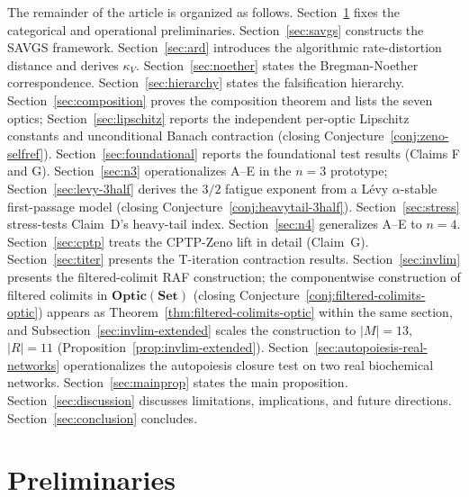 \documentclass[11pt,a4paper]{article}
\theoremstyle{plain}
\theoremstyle{definition}
\theoremstyle{remark}
\newcommand{\kk}{\kappa_{\!V}}
\newcommand{\Optic}{\mathbf{Optic}}
\begin{document}
The remainder of the article is organized as follows.
Section~\ref{sec:prelim} fixes the categorical and operational
preliminaries. Section~\ref{sec:savgs} constructs the SAVGS framework.
Section~\ref{sec:ard} introduces the algorithmic rate-distortion
distance and derives $\kk$. Section~\ref{sec:noether} states the
Bregman-Noether correspondence. Section~\ref{sec:hierarchy} states the
falsification hierarchy. Section~\ref{sec:composition} proves the
composition theorem and lists the seven optics;
Section~\ref{sec:lipschitz} reports the independent per-optic Lipschitz
constants and unconditional Banach contraction (closing
Conjecture~\ref{conj:zeno-selfref}).
Section~\ref{sec:foundational} reports the foundational test results
(Claims F and G). Section~\ref{sec:n3} operationalizes A--E in the
$n=3$ prototype; Section~\ref{sec:levy-3half} derives the $3/2$
fatigue exponent from a L\'evy $\alpha$-stable first-passage model
(closing Conjecture~\ref{conj:heavytail-3half}).
Section~\ref{sec:stress} stress-tests Claim~D's heavy-tail index.
Section~\ref{sec:n4} generalizes A--E to $n=4$.
Section~\ref{sec:cptp} treats the CPTP-Zeno lift in detail
(Claim~G). Section~\ref{sec:titer} presents the T-iteration contraction
results. Section~\ref{sec:invlim} presents the filtered-colimit RAF
construction; the componentwise construction of filtered colimits in
$\Optic(\mathbf{Set})$ (closing Conjecture~\ref{conj:filtered-colimits-optic})
appears as Theorem~\ref{thm:filtered-colimits-optic} within the same
section, and Subsection~\ref{sec:invlim-extended} scales the
construction to $|M|=13$, $|R|=11$ (Proposition~\ref{prop:invlim-extended}).
Section~\ref{sec:autopoiesis-real-networks} operationalizes
the autopoiesis closure test on two real biochemical networks.
Section~\ref{sec:mainprop} states the main proposition.
Section~\ref{sec:discussion} discusses limitations, implications, and
future directions. Section~\ref{sec:conclusion} concludes.

\section{Preliminaries}\label{sec:prelim}
\end{document}
